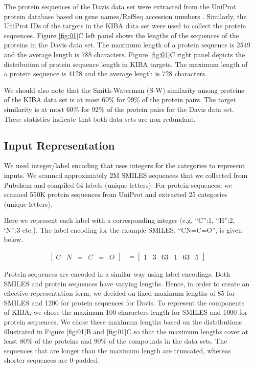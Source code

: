 \documentclass[11pt,letterpaper]{article}
\begin{document}
The protein sequences of the Davis data set were extracted from the UniProt protein database based on gene names/RefSeq accession numbers  \cite{apweiler2004uniprot}. Similarly, the UniProt IDs of the targets in the KIBA data set were used to collect the protein sequences. Figure \ref{fig:01}C left panel shows the lengths of the sequences of the proteins in the Davis data set. The maximum length of a protein sequence is 2549 and the average length is 788 characters. Figure \ref{fig:01}C right panel depicts the distribution of protein sequence length in KIBA targets.  The maximum length of a protein sequence is 4128 and the average length is 728 characters.

We should also note that the Smith-Waterman (S-W) similarity among proteins of the KIBA data set is at most 60\%  for 99\% of the protein pairs. The target similarity is at most 60\% for 92\% of the protein pairs for the Davis data set. These statistics indicate that both data sets are  non-redundant.


\subsection*{Input Representation}

We used  integer/label encoding that  uses integers  for the categories  to  represent inputs. We scanned  approximately 2M SMILES sequences that we collected from Pubchem and compiled 64 labels (unique letters). For protein sequences, we scanned 550K protein sequences from UniProt and extracted 25 categories (unique letters). 

Here we  represent each label with a corresponding integer (e.g. ``C'':1, ``H'':2, `N'':3 etc.). The label encoding for the example SMILES, ``CN=C=O'', is given below.  

 \begin{align*}
   \begin{bmatrix}
           C  & N & = & C & = & O
         \end{bmatrix}
&= 
\begin{bmatrix}
		1 & 3 & 63 & 1 & 63 & 5
         \end{bmatrix}
\end{align*}

Protein sequences are encoded in a similar way using label encodings. Both SMILES and protein sequences have varying lengths. Hence, in order to create an effective representation form, we decided on fixed maximum lengths of 85 for SMILES and 1200 for protein sequences for Davis. To represent the components of KIBA, we chose the maximum 100 characters length for SMILES and 1000 for protein sequences. We chose these maximum lengths based on the distributions illustrated in Figure \ref{fig:01}B and \ref{fig:01}C so that the maximum lengths cover at least 80\% of the proteins and 90\% of the compounds in the data sets. The sequences that are longer than the maximum length are truncated, whereas shorter sequences are 0-padded.
\end{document}
